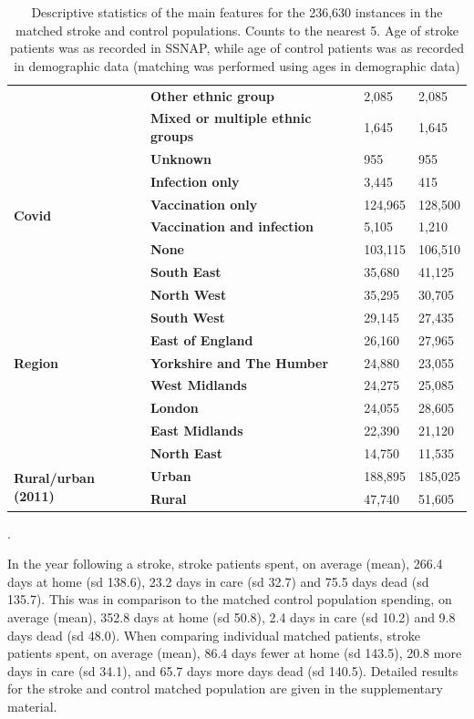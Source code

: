 \begin{table}[!ht]
\begin{tabular}{|l|l|l|l|}
        & \bf Other ethnic group & 2,085 & 2,085 \\
        & \bf Mixed or multiple ethnic groups & 1,645 & 1,645 \\
        & \bf Unknown & 955 & 955 \\ \hline
        \multirow{4}{*}{\bf Covid} & \bf Infection only & 3,445 & 415 \\
        & \bf Vaccination only & 124,965 & 128,500 \\
        & \bf Vaccination and infection & 5,105 & 1,210 \\
        & \bf None & 103,115 & 106,510 \\ \hline
        \multirow{9}{*}{\bf Region} & \bf South East & 35,680 & 41,125 \\
        & \bf North West & 35,295 & 30,705 \\
        & \bf South West & 29,145 & 27,435 \\
        & \bf East of England & 26,160 & 27,965 \\
        & \bf Yorkshire and The Humber & 24,880 & 23,055 \\
        & \bf West Midlands & 24,275 & 25,085 \\
        & \bf London & 24,055 & 28,605 \\
        & \bf East Midlands & 22,390 & 21,120 \\
        & \bf North East & 14,750 & 11,535 \\ \hline
        \multirow{2}{*}{\bf Rural/urban (2011)} & \bf Urban & 188,895 & 185,025 \\
        & \bf Rural & 47,740 & 51,605 \\ \hline
    \end{tabular}
    \caption{Descriptive statistics of the main features for the 236,630 instances in the matched stroke and control populations. Counts to the nearest 5. Age of stroke patients was as recorded in SSNAP, while age of control patients was as recorded in demographic data (matching was performed using ages in demographic data)}.
    \label{tab:populations}
\end{table}

In the year following a stroke, stroke patients spent, on average (mean), 266.4 days at home (sd 138.6), 23.2 days in care (sd 32.7) and 75.5 days dead (sd 135.7). This was in comparison to the matched control population spending, on average (mean), 352.8 days at home (sd 50.8), 2.4 days in care (sd 10.2) and 9.8 days dead (sd 48.0). When comparing individual matched patients, stroke patients spent, on average (mean), 86.4 days fewer at home (sd 143.5), 20.8 more days in care (sd 34.1), and 65.7 days more days dead (sd 140.5). Detailed results for the stroke and control matched population are given in the supplementary material.

